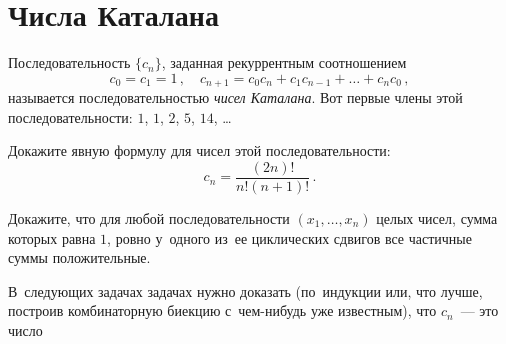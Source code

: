 
\section*{Числа Каталана}


Последовательность $\{ c_{n} \}$, заданная рекуррентным соотношением
\[
    c_{0} = c_{1} = 1
\, , \quad
    c_{n+1} = c_{0} c_{n} + c_{1} c_{n-1} + \ldots + c_{n} c_{0}
\, , \]
называется последовательностью \emph{чисел Каталана}.
Вот первые члены этой последовательности: $1$, $1$, $2$, $5$, $14$, \ldots

\begin{problems}

\item
Докажите явную формулу для чисел этой последовательности:
\[
    c_{n} = \frac{(2 n)!}{n! (n + 1)!}
\, . \]

\item
Докажите, что для любой последовательности $(x_{1}, \ldots, x_{n})$ целых
чисел, сумма которых равна $1$, ровно у~одного из~ее циклических сдвигов все
частичные суммы положительные.

\end{problems}

В~следующих задачах задачах нужно доказать (по~индукции или, что лучше,
построив комбинаторную биекцию с~чем-нибудь уже известным), что $c_n$~---
это число


